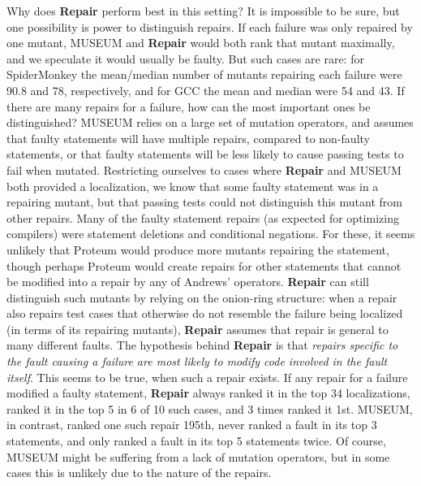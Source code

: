 Why does {\bf Repair} perform best in this setting?  It is impossible to be sure, but one  possibility is power to distinguish repairs. If each failure was only repaired by one mutant, MUSEUM and {\bf Repair} would both rank that mutant maximally, and we speculate it would usually be faulty.  But such cases are rare:  for SpiderMonkey the mean/median number of mutants repairing each failure were 90.8 and 78, respectively, and for GCC the mean and median were 54 and 43.  If there are many repairs for a failure, how can the most important ones be distinguished?  MUSEUM relies on a large set of mutation operators, and assumes that faulty statements will have multiple repairs, compared to non-faulty statements, or that faulty statements will be less likely to cause passing tests to fail when mutated.  Restricting ourselves to cases where {\bf Repair} and MUSEUM both provided a localization, we know that some faulty statement was in a repairing mutant, but that passing tests could not distinguish this mutant  from other repairs.  Many of the faulty statement repairs (as expected for optimizing compilers) were statement deletions and conditional negations.  For these, it seems unlikely that Proteum would produce more mutants repairing the statement, though perhaps Proteum would create repairs for other statements that cannot be modified into a repair by any of Andrews' operators.  {\bf Repair} can still distinguish such mutants by relying on the onion-ring structure:  when a repair also repairs test cases that otherwise do not resemble the failure being localized (in terms of its repairing mutants), {\bf Repair} assumes that repair is general to many different faults.  The hypothesis behind {\bf Repair} is that \emph{repairs specific to the fault causing a failure are most likely to modify code involved in the fault itself}.  This seems to be true, when such a repair exists.  If any repair for a failure modified a faulty statement, {\bf Repair} always ranked it in the top 34 localizations, ranked it in the top 5 in 6 of 10 such cases, and 3 times ranked it 1st.  MUSEUM, in contrast, ranked one such repair 195th, never ranked a fault in its top 3 statements, and only ranked a fault in its top 5 statements twice.  Of course, MUSEUM might be suffering from a lack of mutation operators, but in some cases this is unlikely due to the nature of the repairs.

